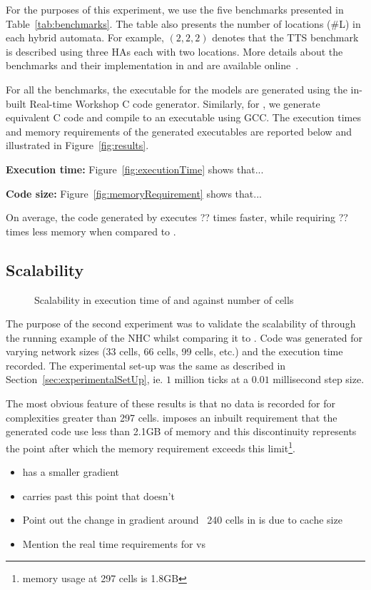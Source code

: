 For the purposes of this experiment, we use the five benchmarks presented in Table~\ref{tab:benchmarks}.
The table also presents the number of locations (\#L) in each hybrid automata.
For example, $(2, 2, 2)$ denotes that the \acf{TTS} benchmark is described using three \acp{HA} each with two locations.
More details about the benchmarks and their implementation in \ourTool and \simulink are available online~\cite{githubBenchmarks}.

For all the benchmarks, the executable for the \simulink models are generated using the in-built Real-time Workshop\textsuperscript{\textregistered} C code generator.
Similarly, for \ourTool, we generate equivalent C code and compile to an executable using GCC.
The execution times and memory requirements of the generated executables are reported below and illustrated in Figure~\ref{fig:results}.

\textbf{Execution time:} 
Figure~\ref{fig:executionTime} shows that...

\textbf{Code size:}
Figure~\ref{fig:memoryRequirement} shows that...

On average, the code generated by \ourTool executes ?? times faster, while requiring ?? times less memory when compared to \simulink.




\subsection{Scalability}

\begin{figure}[htbp]
	\centering
	
	\caption{Scalability in  execution time of \simulink and \ourTool against number of cells}
	\label{fig:scalability}
\end{figure}

The purpose of the second experiment was to validate the scalability of \ourTool through the running example of the \ac{NHC} whilst comparing it to \simulink.
Code was generated for varying network sizes (33 cells, 66 cells, 99 cells, etc.) and the execution time recorded.
The experimental set-up was the same as described in Section~\ref{sec:experimentalSetUp}, ie. $1$ million ticks at a $0.01$ millisecond step size.

The most obvious feature of these results is that no data is recorded for \simulink for complexities greater than 297 cells. \simulink imposes an inbuilt requirement that the generated code use less than 2.1GB of memory and this discontinuity represents the point after which the memory requirement exceeds this limit\footnote{\simulink memory usage at 297 cells is 1.8GB}.

\begin{itemize}
	\item \ourTool has a smaller gradient
	\item \ourTool carries past this point that \simulink doesn't
	\item Point out the change in gradient around ~240 cells in \ourTool is due to cache size
	\item Mention the real time requirements for \ourTool vs \simulink
\end{itemize}